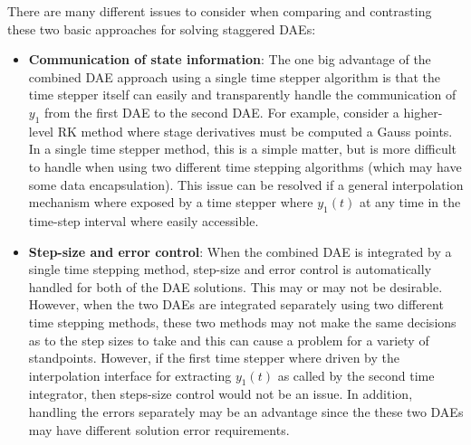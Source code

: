 \documentclass[pdf,ps2pdf,11pt]{SANDreport}
\begin{document}
There are many different issues to consider when comparing and contrasting
these two basic approaches for solving staggered DAEs:
%
\begin{itemize}
%
{}\item {}\textbf{Communication of state information}: The one big advantage
of the combined DAE approach using a single time stepper algorithm is that the
time stepper itself can easily and transparently handle the communication of
$y_1$ from the first DAE to the second DAE.  For example, consider a
higher-level RK method where stage derivatives must be computed a Gauss
points.  In a single time stepper method, this is a simple matter, but is more
difficult to handle when using two different time stepping algorithms (which
may have some data encapsulation).  This issue can be resolved if a general
interpolation mechanism where exposed by a time stepper where $y_1(t)$ at any
time in the time-step interval where easily accessible.
%
{}\item {}\textbf{Step-size and error control}: When the combined DAE is
integrated by a single time stepping method, step-size and error control is
automatically handled for both of the DAE solutions.  This may or may not be
desirable.  However, when the two DAEs are integrated separately using two
different time stepping methods, these two methods may not make the same
decisions as to the step sizes to take and this can cause a problem for a
variety of standpoints.  However, if the first time stepper where driven by
the interpolation interface for extracting $y_1(t)$ as called by the second
time integrator, then steps-size control would not be an issue.  In addition,
handling the errors separately may be an advantage since the these two DAEs
may have different solution error requirements.


\end{itemize}
\end{document}
